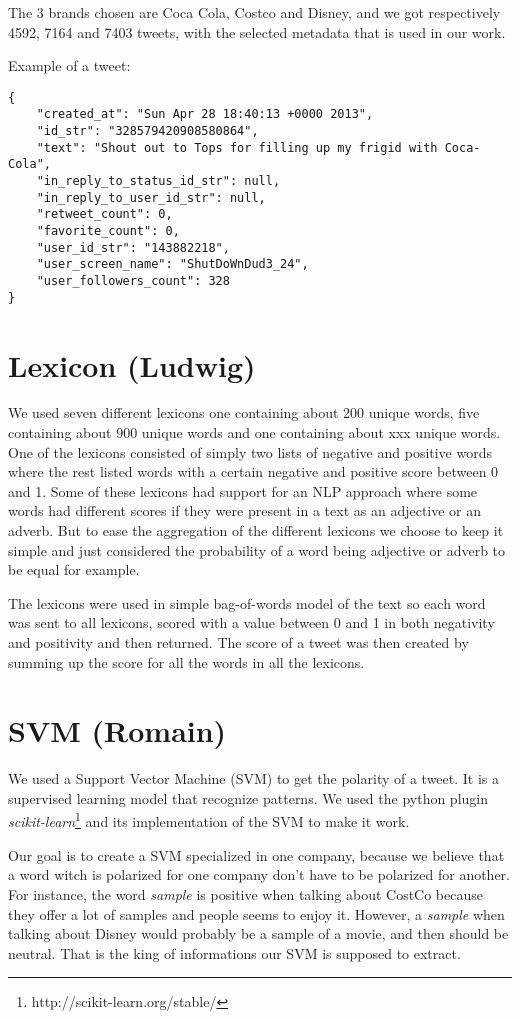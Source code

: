 \documentclass[a4paper,12pt]{report}
\begin{document}
The 3 brands chosen are Coca Cola, Costco and Disney, and we got respectively 4592, 7164 and 7403 tweets, with the selected metadata that is used in our work.

Example of a tweet:

\begin{verbatim}
{
    "created_at": "Sun Apr 28 18:40:13 +0000 2013",
    "id_str": "328579420908580864",
    "text": "Shout out to Tops for filling up my frigid with Coca-Cola",
    "in_reply_to_status_id_str": null,
    "in_reply_to_user_id_str": null, 
    "retweet_count": 0,
    "favorite_count": 0,
    "user_id_str": "143882218",
    "user_screen_name": "ShutDoWnDud3_24",
    "user_followers_count": 328
}
\end{verbatim}

\section{Lexicon (Ludwig)}
We used seven different lexicons one containing about 200 unique words, five containing about 900 unique words and one containing about xxx unique words.
One of the lexicons consisted of simply two lists of negative and positive words where the rest listed words with a certain negative and positive score between 0 and 1. 
Some of these lexicons had support for an NLP approach where some words had different scores if they were present in a text as an adjective or an adverb.  
But to ease the aggregation of the different lexicons we choose to keep it simple and just considered the probability of a word being adjective or adverb to be equal for example.

The lexicons were used in simple bag-of-words model of the text so each word was sent to all lexicons, scored with a value between 0 and 1 in both negativity and positivity and then returned. 
The score of a tweet was then created by summing up the score for all the words in all the lexicons. 

\section{SVM (Romain)}
We used a Support Vector Machine (SVM) to get the polarity of a tweet. It is a supervised learning model that recognize patterns. We used the python plugin \textit{scikit-learn}\footnote{http://scikit-learn.org/stable/} and its implementation of the SVM to make it work.

Our goal is to create a SVM specialized in one company, because we believe that a word witch is polarized for one company don't have to be polarized for another.
For instance, the word \textit{sample} is positive when talking about CostCo because they offer a lot of samples and people seems to enjoy it. However, a \textit{sample} when talking about Disney would probably be a sample of a movie, and then should be neutral.
That is the king of informations our SVM is supposed to extract.
\end{document}
